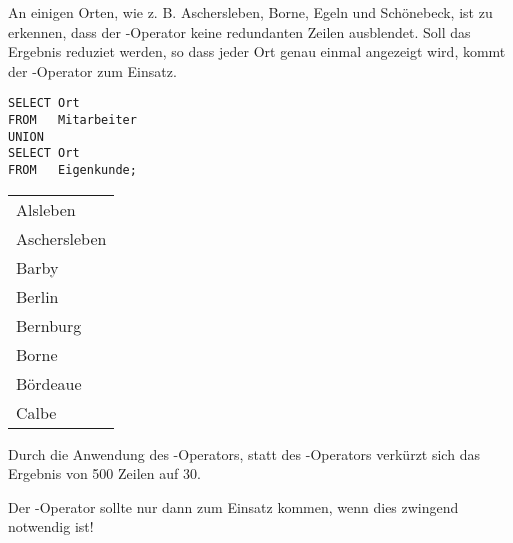           An einigen Orten, wie z. B. Aschersleben, Borne, Egeln und Sch\"onebeck, ist zu erkennen, dass der -Operator keine redundanten Zeilen ausblendet. Soll das Ergebnis reduziet werden, so dass jeder Ort genau einmal angezeigt wird, kommt der -Operator zum Einsatz.
          \begin{lstlisting}[language=oracle_sql,caption={Orte, an denen Kunden oder Mitarbeiter leben (reduziert)},label=sql04_23]
SELECT Ort
FROM   Mitarbeiter
UNION
SELECT Ort
FROM   Eigenkunde;
          \end{lstlisting}
          \begin{center}
            \begin{small}
              \tablehead{}
              \begin{msoraclesql}
                \begin{supertabular}{l}
                  Alsleben \\
                  Aschersleben \\
                  Barby \\
                  Berlin \\
                  Bernburg \\
                  Borne \\
                  B\"ordeaue \\
                  Calbe \\
                \end{supertabular}
              \end{msoraclesql}
            \end{small}
          \end{center}
          Durch die Anwendung des -Operators, statt des -Operators verk\"urzt sich das Ergebnis von 500 Zeilen auf 30.
          \begin{merke}
            Der -Operator sollte nur dann zum Einsatz kommen, wenn dies zwingend notwendig ist!
          \end{merke}

